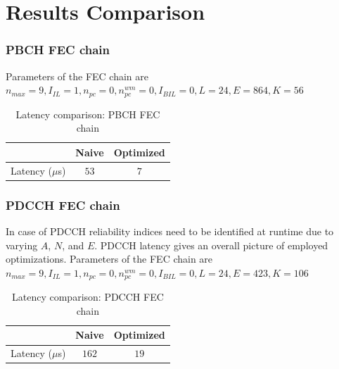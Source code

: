 \section{Results Comparison}

\subsubsection{PBCH FEC chain}
Parameters of the FEC chain are \newline
$n_{max} = 9, I_{IL} = 1, n_{pc} = 0, n_{pc}^{wm} = 0, I_{BIL} = 0, L = 24, E = 864, K = 56$
\begin{table}[!h]
	\begin{center}
		\caption{Latency comparison: PBCH FEC chain}
		\label{tab:pbchFecChain}
		\begin{tabular}{c|c|c} %
			\textbf{ } & Naive & Optimized \\
			\hline
			Latency ($\mu$s) & $53$ & $7$\\
		\end{tabular}
	\end{center}
\end{table}

\subsubsection{PDCCH FEC chain} 
In case of PDCCH reliability indices need to be identified at runtime due to varying $A$, $N$, and $E$. PDCCH latency gives an overall picture of employed optimizations. Parameters of the FEC chain are \newline
$n_{max} = 9, I_{IL} = 1, n_{pc} = 0, n_{pc}^{wm} = 0, I_{BIL} = 0, L = 24, E = 423, K = 106$
\begin{table}[!h]
	\begin{center}
		\caption{Latency comparison: PDCCH FEC chain}
		\label{tab:pdcchFecChain}
		\begin{tabular}{c|c|c} %
			\textbf{ } & Naive & Optimized \\
			\hline
			Latency ($\mu$s) & $162$ & $19$\\
		\end{tabular}
	\end{center}
\end{table}

